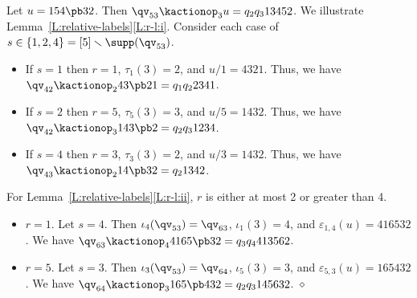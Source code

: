 \begin{example}\label{Ex:three_cases}
  Let $u=154\pb32$.
  Then $\qv_{53}\kactionop_3 u = q_2q_3 13452$.
  We illustrate Lemma~\ref{L:relative-labels}\ref{L:r-l:i}.
  Consider each case of $s\in\{1,2,4\}=[5]\smallsetminus\supp(\qv_{53})$.
  \begin{itemize}

    \item  If $s=1$ then $r=1$, $\tau_1(3)=2$, and $u/1=4321$.
     Thus, we have $\qv_{42}\kactionop_2 43\pb 21= q_1q_2 2341$.
 
    \item  If $s=2$  then $r=5$, $\tau_5(3)=3$, and $u/5=1432$.
     Thus, we have $\qv_{42}\kactionop_3 143\pb 2= q_2 q_3 1234$.
 
    \item  If  $s=4$  then $r=3$, $\tau_3(3)=2$, and $u/3=1432$.
     Thus, we have $\qv_{43}\kactionop_2 14\pb32= q_2 1342$.
  \end{itemize}

   For Lemma~\ref{L:relative-labels}\ref{L:r-l:ii}, $r$ is either at most 2 or greater than 4.
  \begin{itemize}

     \item $r=1$.  Let $s=4$.  Then $\iota_4(\qv_{53})=\qv_{63}$, $\iota_1(3)=4$, and $\varepsilon_{1,4}(u)=416532$.
   We have $\qv_{63}\kactionop_4 4165\pb 32=q_3q_4 413562$.

    \item   $r=5$.  Let $s=3$.  Then $\iota_3(\qv_{53})=\qv_{64}$, $\iota_5(3)=3$, and $\varepsilon_{5,3}(u)=165432$.
   We have $\qv_{64}\kactionop_3 165\pb 432=q_2q_3 145632$. 
   \hfill$\diamond$
  \end{itemize}
\end{example}

